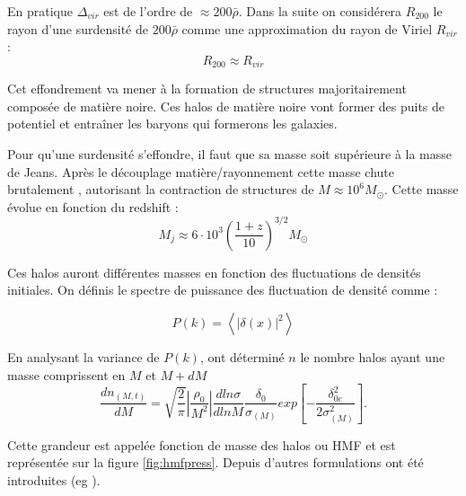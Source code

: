 En pratique $\Delta_{vir}$ est de l'ordre de $\approx 200 \bar{\rho}$.
Dans la suite on considérera $R_{200}$ le rayon d'une surdensité de $200 \bar{\rho}$ comme une approximation du rayon de Viriel $R_{vir}$:
\begin{equation}
R_{200} \approx R_{vir}
\end{equation}

Cet effondrement va mener à la formation de structures majoritairement composée de matière noire.
Ces halos de matière noire vont former des puits de potentiel et entraîner les baryons qui formerons les galaxies.

Pour qu'une surdensité s'effondre, il faut que sa masse soit supérieure à la masse de Jeans.
Après le découplage matière/rayonnement cette masse chute brutalement \citep{2010gfe..book.....M}, autorisant la contraction de structures de $M \approx 10^6 M_\odot$.
Cette masse évolue en fonction du redshift \citep{2016PhR...645....1B} : 
\begin{equation}
M_j \approx 6 \cdot 10 ^3 \left( \frac{1+z}{10} \right)^{3/2} M_\odot
\end{equation}

Ces halos auront différentes masses en fonction des fluctuations de densités initiales.
On définis le spectre de puissance des fluctuation de densité comme :

\begin{equation}
P(k) = \left< | \delta(x) |^2 \right>
\end{equation}

En analysant la variance de $P(k)$, \cite{1974ApJ...187..425P} ont déterminé $n$ le nombre halos ayant une masse comprissent en $M$ et $M+dM$
\begin{equation}
\frac{dn_{(M,t)}}{dM} = \sqrt{\frac{2}{\pi}} \left| \frac{\rho_0}{M^2} \right| \frac{d ln \sigma}{d ln M} \frac{\delta_0}{\sigma_{(M)}} exp \left[ - \frac{\delta_{0c}^2}{2\sigma_{(M)}^2} \right].
\end{equation}

Cette grandeur est appelée fonction de masse des halos ou \ac{HMF} et est représentée sur la figure \ref{fig:hmfpress}.
Depuis d'autres formulations ont été introduites (eg \cite{1999MNRAS.308..119S}).

